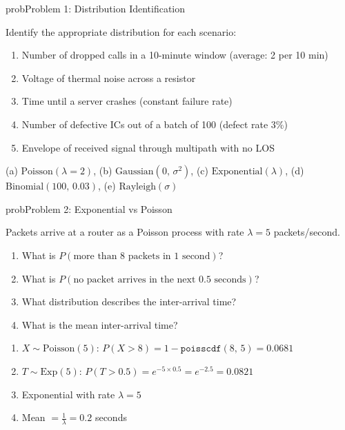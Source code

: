 
\begin{PSbox}[unbreakable]{prob}{Problem 1: Distribution Identification}

Identify the appropriate distribution for each scenario:

\begin{enumerate}
\def\labelenumi{(\alph{enumi})}
\tightlist
\item
  Number of dropped calls in a 10-minute window (average: 2 per 10 min)
\item
  Voltage of thermal noise across a resistor
\item
  Time until a server crashes (constant failure rate)
\item
  Number of defective ICs out of a batch of 100 (defect rate 3\%)
\item
  Envelope of received signal through multipath with no LOS
\end{enumerate}

\PSsolution{} (a) $\mathrm{Poisson}(\lambda = 2)$, (b) $\mathrm{Gaussian}(0,\, \sigma^{2})$, (c) $\mathrm{Exponential}(\lambda)$, (d) $\mathrm{Binomial}(100,\, 0.03)$, (e) $\mathrm{Rayleigh}(\sigma)$

\end{PSbox}

\begin{PSbox}[unbreakable]{prob}{Problem 2: Exponential vs Poisson}

Packets arrive at a router as a Poisson process with rate $\lambda = 5$ packets/second.

\begin{enumerate}
\def\labelenumi{(\alph{enumi})}
\tightlist
\item
  What is $P(\text{more than 8 packets in 1 second})$?
\item
  What is $P(\text{no packet arrives in the next 0.5 seconds})$?
\item
  What distribution describes the inter-arrival time?
\item
  What is the mean inter-arrival time?
\end{enumerate}

\PSsolution{} 

\begin{enumerate}
\def\labelenumi{(\alph{enumi})}
\tightlist
\item
  $X \sim \mathrm{Poisson}(5)$: $P(X > 8) = 1 - \texttt{poisscdf}(8,\, 5) = 0.0681$
\item
  $T \sim \mathrm{Exp}(5)$: $P(T > 0.5) = e^{-5 \times 0.5} = e^{-2.5} = 0.0821$
\item
  Exponential with rate $\lambda = 5$
\item
  Mean $= \frac{1}{\lambda} = 0.2$ seconds
\end{enumerate}

\end{PSbox}

